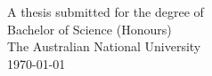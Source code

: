 
\begin{titlepage}
  \enlargethispage{2cm}
  \begin{center}
    \makeatletter
    \Huge\textbf{\@title} \\[.4cm]
    \huge\textbf{\@author} \\[9cm]
    \makeatother
    \LARGE A thesis submitted for the degree of \\
    Bachelor of Science (Honours) \\
    The Australian National University \\[2cm]
    \today
  \end{center}
\end{titlepage}

